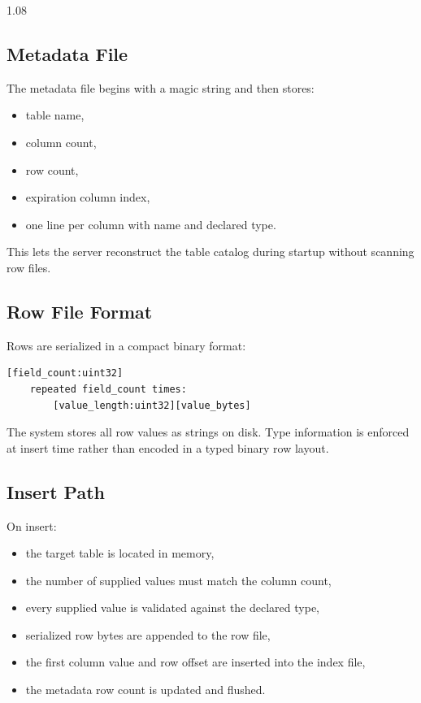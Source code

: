 \documentclass[11pt,a4paper]{article}
\begin{document}
\begin{spacing}{1.08}
\subsection{Metadata File}

The metadata file begins with a magic string and then stores:

\begin{itemize}
    \item table name,
    \item column count,
    \item row count,
    \item expiration column index,
    \item one line per column with name and declared type.
\end{itemize}

This lets the server reconstruct the table catalog during startup without scanning row files.

\subsection{Row File Format}

Rows are serialized in a compact binary format:

\begin{lstlisting}
[field_count:uint32]
    repeated field_count times:
        [value_length:uint32][value_bytes]
\end{lstlisting}

The system stores all row values as strings on disk. Type information is enforced at insert time rather than encoded in a typed binary row layout.

\subsection{Insert Path}

On insert:

\begin{itemize}
    \item the target table is located in memory,
    \item the number of supplied values must match the column count,
    \item every supplied value is validated against the declared type,
    \item serialized row bytes are appended to the row file,
    \item the first column value and row offset are inserted into the index file,
    \item the metadata row count is updated and flushed.
\end{itemize}


\end{spacing}
\end{document}
